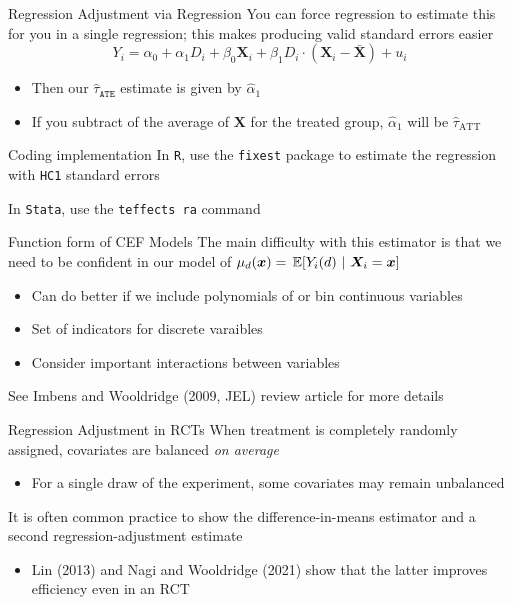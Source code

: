 \documentclass[aspectratio=169,t,11pt,table]{beamer}
\begin{document}
\begin{frame}{Regression Adjustment via Regression}
  You can force regression to estimate this for you in a single regression; this makes producing valid standard errors easier
  $$
    Y_i = \alpha_0 + \alpha_1 D_i + \beta_0 \bm{X}_i + \beta_1 D_i \cdot (\bm{X}_i - \bar{\bm{X}}) + u_i
  $$
  \begin{itemize}
    \item Then our $\hat{\tau}_{\texttt{ATE}}$ estimate is given by $\hat{\alpha}_1$
    \item If you subtract of the average of $\bm{X}$ for the treated group, $\hat{\alpha}_1$ will be $\hat{\tau}_{\text{ATT}}$
  \end{itemize}
\end{frame}

\begin{frame}{Coding implementation}
  In \texttt{R}, use the \texttt{fixest} package to estimate the regression with \texttt{HC1} standard errors

  \bigskip
  In \texttt{Stata}, use the \texttt{teffects ra} command
\end{frame}

\begin{frame}{Function form of CEF Models}
  The main difficulty with this estimator is that we need to be confident in our model of $\mu_d(\bm{x}) = \expec{Y_i(d)}{\bm{X}_i = \bm{x}}$
  \begin{itemize}
    \item Can do better if we include polynomials of or bin continuous variables 
    \item Set of indicators for discrete varaibles
    \item Consider important interactions between variables
  \end{itemize}

  \bigskip
  See Imbens and Wooldridge (2009, JEL) review article for more details
\end{frame}

\begin{frame}{Regression Adjustment in RCTs}
  When treatment is completely randomly assigned, covariates are balanced \emph{on average}
  \begin{itemize}
    \item For a single draw of the experiment, some covariates may remain unbalanced
  \end{itemize}

  \pause
  \bigskip
  It is often common practice to show the difference-in-means estimator and a second regression-adjustment estimate
  \begin{itemize}
    \item Lin (2013) and Nagi and Wooldridge (2021) show that the latter improves efficiency even in an RCT
  \end{itemize}
\end{frame}
\end{document}
